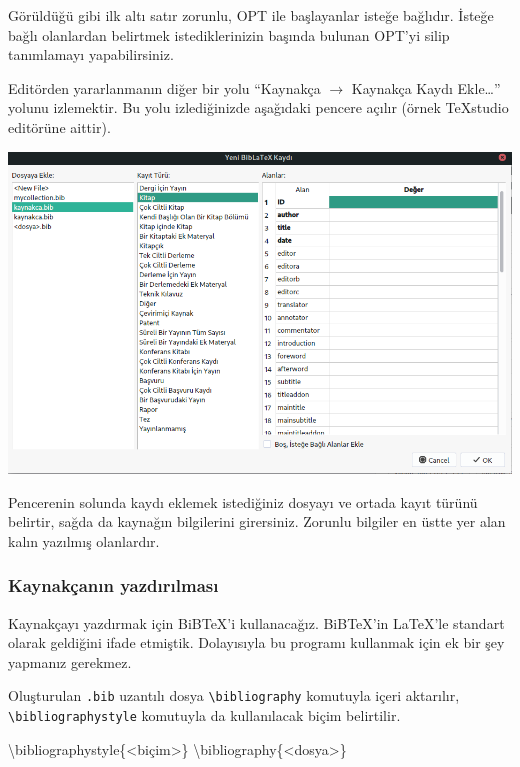 \documentclass[
  10pt,
]{scrbook}
\newenvironment{Shaded}{}{}
\newcommand{\BuiltInTok}[1]{#1}
\newcommand{\ExtensionTok}[1]{#1}
\newcommand{\NormalTok}[1]{#1}
\theoremstyle{definition}
\theoremstyle{definition}
\theoremstyle{definition}
\theoremstyle{definition}
\theoremstyle{remark}
\begin{document}
Görüldüğü gibi ilk altı satır zorunlu, OPT ile başlayanlar isteğe bağlıdır. İsteğe bağlı olanlardan belirtmek istediklerinizin başında bulunan OPT'yi silip tanımlamayı yapabilirsiniz.

Editörden yararlanmanın diğer bir yolu ``Kaynakça \(\rightarrow\) Kaynakça Kaydı Ekle\ldots{}'' yolunu izlemektir. Bu yolu izlediğinizde aşağıdaki pencere açılır (örnek TeXstudio editörüne aittir).

\includegraphics{images/tex-studio.png}

Pencerenin solunda kaydı eklemek istediğiniz dosyayı ve ortada kayıt türünü belirtir, sağda da kaynağın bilgilerini girersiniz. Zorunlu bilgiler en üstte yer alan kalın yazılmış olanlardır.

\hypertarget{kaynakuxe7anux131n-yazdux131rux131lmasux131}{%
\subsubsection{Kaynakçanın yazdırılması}\label{kaynakuxe7anux131n-yazdux131rux131lmasux131}}

Kaynakçayı yazdırmak için BiBTeX'i kullanacağız. BiBTeX'in LaTeX'le standart olarak geldiğini ifade etmiştik. Dolayısıyla bu programı kullanmak için ek bir şey yapmanız gerekmez.

Oluşturulan \texttt{.bib} uzantılı dosya \texttt{\textbackslash{}bibliography} komutuyla içeri aktarılır, \texttt{\textbackslash{}bibliographystyle} komutuyla da kullanılacak biçim belirtilir.

\begin{Shaded}
\begin{Highlighting}[]
\BuiltInTok{\textbackslash{}bibliographystyle}\NormalTok{\{}\ExtensionTok{\textless{}biçim\textgreater{}}\NormalTok{\}}
\BuiltInTok{\textbackslash{}bibliography}\NormalTok{\{}\ExtensionTok{\textless{}dosya\textgreater{}}\NormalTok{\}}
\end{Highlighting}
\end{Shaded}
\end{document}
